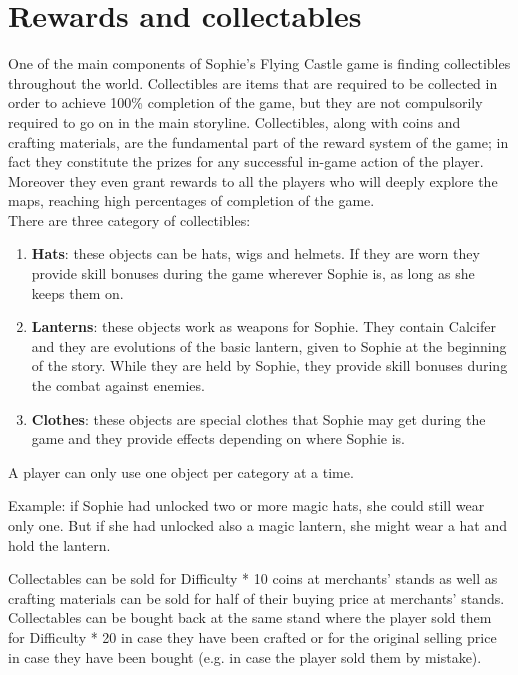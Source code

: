 \section{Rewards and collectables}
One of the main components of Sophie's Flying Castle game is finding collectibles throughout the world.
Collectibles are items that are required to be collected in order to achieve 100\%
completion of the game, but they are not compulsorily required to go on in the main storyline. Collectibles, along with coins and crafting materials, are the fundamental part of the reward system of the game; in fact they constitute the prizes for any successful in-game action of the player. Moreover they even grant rewards to all the players who will deeply explore the maps, reaching high percentages of completion of the game.\\

There are three category of collectibles:
\begin{enumerate}
\item \textbf{Hats}: these objects can be hats, wigs and helmets. If they are worn they provide skill bonuses during the game wherever Sophie is, as long as she keeps them on.
\item \textbf{Lanterns}: these objects work as weapons for Sophie. They contain Calcifer and they are evolutions of the basic lantern, given to Sophie at the beginning of the story. While they are held by Sophie, they provide skill bonuses during the combat against enemies. 
\item \textbf{Clothes}: these objects are special clothes that Sophie may get during the game and they provide effects depending on where Sophie is.  
  \end{enumerate}

A player can only use one object per category at a time.

Example: if Sophie had unlocked two or more magic hats, she could still wear only one. But if she had unlocked also a magic lantern, she might wear a hat and hold the lantern.

Collectables can be sold for Difficulty * 10 coins at merchants' stands as well as crafting materials can be sold for half of their buying price at merchants' stands. Collectables can be bought back at the same stand where the player sold them for Difficulty * 20 in case they have been crafted or for the original selling price in case they have been bought (e.g. in case the player sold them by mistake).



